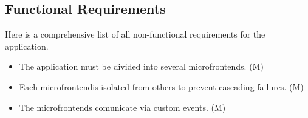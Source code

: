 \subsection{Functional Requirements}
Here is a comprehensive list of all non-functional requirements for the application.
\begin{itemize}
   \item The application must be divided into several microfrontends. (M)
   \item Each microfrontendis isolated from others to prevent cascading failures. (M)
   \item The microfrontends comunicate via custom events. (M)
\end{itemize}